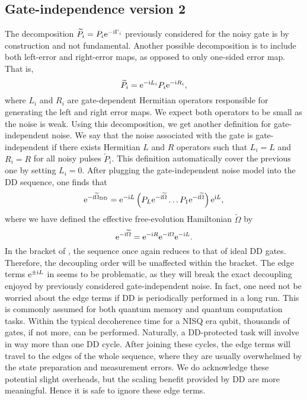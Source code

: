 \documentclass[b5paper,11pt]{article}
\newcommand{\wtP}{\widetilde{P}}
\newcommand{\wtO}{\widetilde{\Omega}}
\newcommand{\rDD}{\mathrm{DD}}
\begin{document}
\subsection{Gate-independence version 2}
The decomposition $\wtP_i = P_i \upe^{-\upi \Gamma_i}$  previously considered for the noisy gate is by construction and not fundamental. 
Another possible decomposition is to include both left-error and right-error maps, as opposed to only one-sided error map. That is,
\begin{equation}\label{eq:leftright-noise}
 \wtP_i = \upe^{-\upi L_i} P_i \upe^{-\upi R_i},
\end{equation}
where $L_i$ and $R_i$ are gate-dependent Hermitian operators responsible for generating the left and right error maps.  We expect both operators  to be small as the noise is weak.
Using this decomposition, we get another definition for gate-independent noise. We say that the noise associated with the gate is gate-independent if there exists Hermitian $L$ and $R$ operators such that 
$L_i=L$ and $R_i = R$ for all noisy pulses $\wtP_i$. This definition automatically cover the previous one by setting $L_i=0$.
After plugging the gate-independent noise model into the DD sequence, one finds that 
\begin{equation}\label{eq:gateindep}
 \upe^{-\upi\wtO_\rDD} = \upe^{-\upi L} \left( P_L \upe^{-\upi \wtO} \ldots  P_1 \upe^{-\upi \wtO } \right) \upe^{\upi L},
\end{equation}
where we have defined the effective free-evolution Hamiltonian $\wtO$ by 
\begin{equation}
 \upe^{-\upi \wtO} = \upe^{-\upi R}  \upe^{-\upi \Omega}  \upe^{-\upi L}.
\end{equation}
In the bracket of , the sequence once again reduces to that of ideal DD gates. Therefore, the decoupling order will be unaffected within the bracket. The edge terms  $\mathrm{e}^{\pm \mathrm{i} L}$ in   seems to be problematic, as they will break the exact decoupling enjoyed by previously considered gate-independent noise. 
In fact, one need not be worried about the edge terms if DD is periodically performed in a long run. This is commonly assumed for both quantum memory and quantum computation tasks. Within the typical decoherence time for a NISQ era qubit, thousands of gates, if not more, can be performed. Naturally, a DD-protected task will involve in way more than one DD cycle. 
After joining these cycles, the edge terms will travel to the edges of the whole sequence, where they are usually overwhelmed by the state preparation and measurement errors. 
We do acknowledge these potential slight overheads, but the scaling benefit provided by DD are more meaningful. Hence it is safe to ignore these edge terms. 
\end{document}
